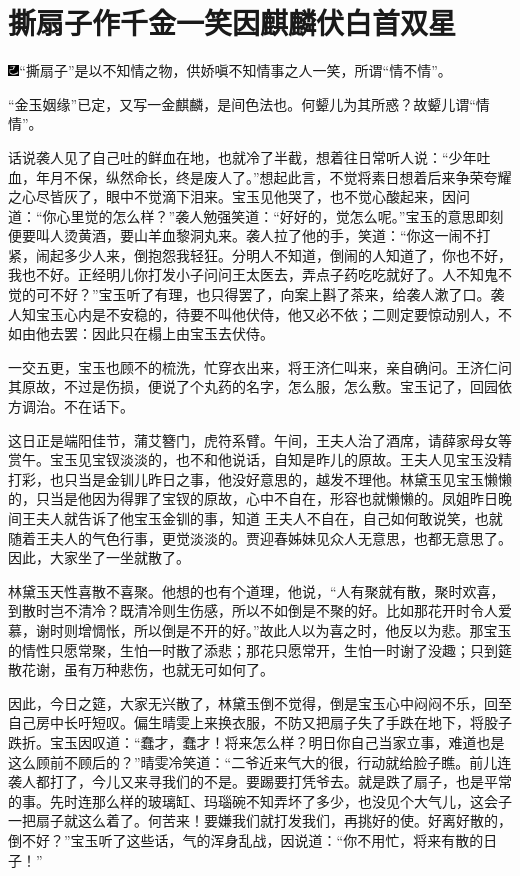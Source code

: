 

\chapter{撕扇子作千金一笑\hspace{.5em}因麒麟伏白首双星}

{\includegraphics[width=3mm]{../Images/00003}``撕扇子''是以不知情之物，供娇嗔不知情事之人一笑，所谓``情不情''。}

{``金玉姻缘''已定，又写一金麒麟，是间色法也。何颦儿为其所惑？故颦儿谓``情情''。}

话说袭人见了自己吐的鲜血在地，也就冷了半截，想着往日常听人说：``少年吐血，年月不保，纵然命长，终是废人了。''想起此言，不觉将素日想着后来争荣夸耀之心尽皆灰了，眼中不觉滴下泪来。宝玉见他哭了，也不觉心酸起来，因问道：``你心里觉的怎么样？''袭人勉强笑道：``好好的，觉怎么呢。''宝玉的意思即刻便要叫人烫黄酒，要山羊血黎洞丸来。袭人拉了他的手，笑道：``你这一闹不打紧，闹起多少人来，倒抱怨我轻狂。分明人不知道，倒闹的人知道了，你也不好，我也不好。正经明儿你打发小子问问王太医去，弄点子药吃吃就好了。人不知鬼不觉的可不好？''宝玉听了有理，也只得罢了，向案上斟了茶来，给袭人漱了口。袭人知宝玉心内是不安稳的，待要不叫他伏侍，他又必不依；二则定要惊动别人，不如由他去罢：因此只在榻上由宝玉去伏侍。

一交五更，宝玉也顾不的梳洗，忙穿衣出来，将王济仁叫来，亲自确问。王济仁问其原故，不过是伤损，便说了个丸药的名字，怎么服，怎么敷。宝玉记了，回园依方调治。不在话下。

这日正是端阳佳节，蒲艾簪门，虎符系臂。午间，王夫人治了酒席，请薛家母女等赏午。宝玉见宝钗淡淡的，也不和他说话，自知是昨儿的原故。王夫人见宝玉没精打彩，也只当是金钏儿昨日之事，他没好意思的，越发不理他。林黛玉见宝玉懒懒的，只当是他因为得罪了宝钗的原故，心中不自在，形容也就懒懒的。凤姐昨日晚间王夫人就告诉了他宝玉金钏的事，知道
王夫人不自在，自己如何敢说笑，也就随着王夫人的气色行事，更觉淡淡的。贾迎春姊妹见众人无意思，也都无意思了。因此，大家坐了一坐就散了。

林黛玉天性喜散不喜聚。他想的也有个道理，他说，``人有聚就有散，聚时欢喜，到散时岂不清冷？既清冷则生伤感，所以不如倒是不聚的好。比如那花开时令人爱慕，谢时则增惆怅，所以倒是不开的好。''故此人以为喜之时，他反以为悲。那宝玉的情性只愿常聚，生怕一时散了添悲；那花只愿常开，生怕一时谢了没趣；只到筵散花谢，虽有万种悲伤，也就无可如何了。

因此，今日之筵，大家无兴散了，林黛玉倒不觉得，倒是宝玉心中闷闷不乐，回至自己房中长吁短叹。偏生晴雯上来换衣服，不防又把扇子失了手跌在地下，将股子跌折。宝玉因叹道：``蠢才，蠢才！将来怎么样？明日你自己当家立事，难道也是这么顾前不顾后的？''晴雯冷笑道：``二爷近来气大的很，行动就给脸子瞧。前儿连袭人都打了，今儿又来寻我们的不是。要踢要打凭爷去。就是跌了扇子，也是平常的事。先时连那么样的玻璃缸、玛瑙碗不知弄坏了多少，也没见个大气儿，这会子一把扇子就这么着了。何苦来！要嫌我们就打发我们，再挑好的使。好离好散的，倒不好？''宝玉听了这些话，气的浑身乱战，因说道：``你不用忙，将来有散的日子！''

